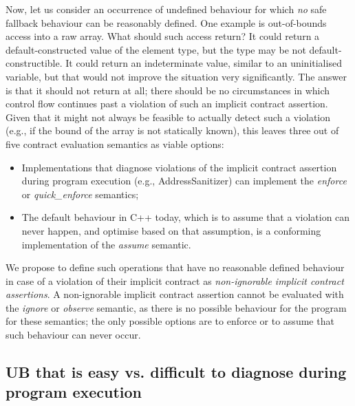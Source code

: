 Now, let us consider an occurrence of undefined behaviour for which \emph{no} safe fallback behaviour can be reasonably defined. One example is out-of-bounds access into a raw array. What should such access return? It could return a default-constructed value of the element type, but the type may be not default-constructible. It could return an indeterminate value, similar to an uninitialised variable, but that would not improve the situation very significantly. The answer is that it should not return at all; there should be no circumstances in which control flow continues past a violation of such an implicit contract assertion. Given that it might not always be feasible to actually detect such a violation (e.g., if the bound of the array is not statically known), this leaves three out of five contract evaluation semantics as viable options:
\begin{itemize}
\item Implementations that diagnose violations of the implicit contract assertion during program execution (e.g., AddressSanitizer) can implement the \emph{enforce} or \emph{quick_enforce} semantics;
\item The default behaviour in C++ today, which is to assume that a violation can never happen, and optimise based on that assumption, is a conforming implementation of the \emph{assume} semantic.
\end{itemize}
We propose to define such operations that have no reasonable defined behaviour in case of a violation of their implicit contract  as \emph{non-ignorable implicit contract assertions}. A non-ignorable implicit contract assertion cannot be evaluated with the \emph{ignore} or \emph{observe} semantic, as there is no possible behaviour for the program for these semantics; the only possible options are to enforce or to assume that such behaviour can never occur.

\subsection{UB that is easy vs. difficult to diagnose during program execution}
\label{easy}

